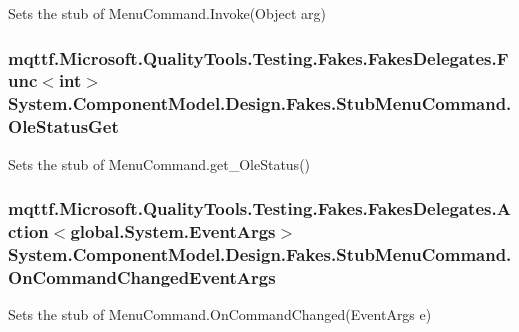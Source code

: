 Sets the stub of Menu\-Command.\-Invoke(\-Object arg)

\hypertarget{class_system_1_1_component_model_1_1_design_1_1_fakes_1_1_stub_menu_command_ae4d0f3f0307d6eb9f21d32f328d8c5d6}{
\subsubsection[{Ole\-Status\-Get}]{\setlength{\rightskip}{0pt plus 5cm}mqttf.\-Microsoft.\-Quality\-Tools.\-Testing.\-Fakes.\-Fakes\-Delegates.\-Func$<$int$>$ System.\-Component\-Model.\-Design.\-Fakes.\-Stub\-Menu\-Command.\-Ole\-Status\-Get}}\label{class_system_1_1_component_model_1_1_design_1_1_fakes_1_1_stub_menu_command_ae4d0f3f0307d6eb9f21d32f328d8c5d6}


Sets the stub of Menu\-Command.\-get\-\_\-\-Ole\-Status()

\hypertarget{class_system_1_1_component_model_1_1_design_1_1_fakes_1_1_stub_menu_command_aaf90bfe21ffe95e4a9ddda435feec2ee}{
\subsubsection[{On\-Command\-Changed\-Event\-Args}]{\setlength{\rightskip}{0pt plus 5cm}mqttf.\-Microsoft.\-Quality\-Tools.\-Testing.\-Fakes.\-Fakes\-Delegates.\-Action$<$global.\-System.\-Event\-Args$>$ System.\-Component\-Model.\-Design.\-Fakes.\-Stub\-Menu\-Command.\-On\-Command\-Changed\-Event\-Args}}\label{class_system_1_1_component_model_1_1_design_1_1_fakes_1_1_stub_menu_command_aaf90bfe21ffe95e4a9ddda435feec2ee}


Sets the stub of Menu\-Command.\-On\-Command\-Changed(\-Event\-Args e)

